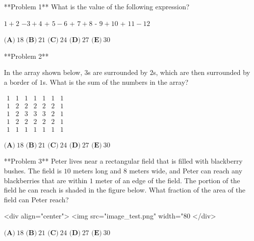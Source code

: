 **Problem 1**
What is the value of the following expression?

$1 + 2$ $- 3 + 4$ + $5 - 6$ + $7 + 8$ - $9 + 10$ + $11 - 12$


$ \textbf{(A)}\ 18$ $\textbf{(B)}\ 21$  $\textbf{(C)}\ 24$ $\textbf{(D)}\ 27$  $\textbf{(E)}\ 30$

**Problem 2**

In the array shown below, $3$s are surrounded by $2$s, which are then surrounded by a border of $1$s. What is the sum of the numbers in the array?

$\begin{matrix}
1 & 1 & 1 & 1 & 1 & 1 & 1 \\
1 & 2 & 2 & 2 & 2 & 2 & 1 \\
1 & 2 & 3 & 3 & 3 & 2 & 1 \\
1 & 2 & 2 & 2 & 2 & 2 & 1 \\
1 & 1 & 1 & 1 & 1 & 1 & 1
\end{matrix}$

$ \textbf{(A)}\ 18$ $\textbf{(B)}\ 21$  $\textbf{(C)}\ 24$ $\textbf{(D)}\ 27$  $\textbf{(E)}\ 30$

**Problem 3**
Peter lives near a rectangular field that is filled with blackberry bushes. The field is $10$ meters long and $8$ meters wide, and Peter can reach any blackberries that are within $1$ meter of an edge of the field. The portion of the field he can reach is shaded in the figure below. What fraction of the area of the field can Peter reach?

<div align="center">
  <img src="image_test.png" width="80%
</div>

$ \textbf{(A)}\ 18$ $\textbf{(B)}\ 21$  $\textbf{(C)}\ 24$ $\textbf{(D)}\ 27$  $\textbf{(E)}\ 30$

